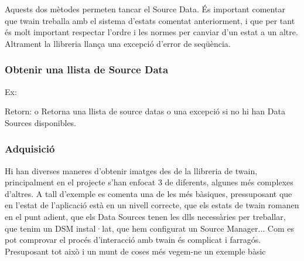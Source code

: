 \documentclass[letterpaper,11pt,catalan]{sphinxmanual}
\begin{document}
\begin{sphinxVerbatim}[commandchars=\\\{\}]
\end{sphinxVerbatim}

Aquests dos mètodes permeten tancar el Source Data.
És important comentar que twain treballa amb el sistema d'estats comentat anteriorment,
i que per tant és molt important respectar l'ordre i les normes per canviar d'un estat
a un altre. Altrament la llibreria llança una excepció d'error de seqüència.


\subsubsection{Obtenir una llista de Source Data}
\label{\detokenize{index:obtenir-una-llista-de-source-data}}
Ex:

\begin{sphinxVerbatim}[commandchars=\\\{\}]
\end{sphinxVerbatim}

Retorn: \sphinxcode{{[}{]}} o 
Retorna una llista de source datas o una excepció si no hi han Data Sources disponibles.


\subsubsection{Adquisició}
\label{\detokenize{index:id1}}
Hi han diverses maneres d'obtenir imatges des de la llibreria de twain, principalment
en el projecte s'han enfocat 3 de diferents, algunes més complexes d'altres.
A tall d'exemple es comenta una de les més bàsiques, pressuposant que en l'estat de l'aplicació
està en un nivell correcte, que els estats de twain romanen en el punt adient, que els Data
Sources tenen les dlls necessàries per treballar, que tenim un DSM instal·lat, que hem
configurat un Source Manager... Com es pot comprovar el procés d'interacció amb twain és
complicat i farragós. Presuposant tot això i un munt de coses més vegem-ne un exemple bàsic
\end{document}
